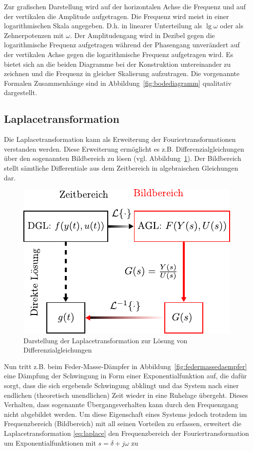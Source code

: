 %
Zur grafischen Darstellung wird auf der horizontalen Achse die Frequenz und auf der vertikalen die Amplitude aufgetragen. Die Frequenz wird meist in einer logarithmischen Skala angegeben. D.h. in linearer Unterteilung als $\lg\omega$ oder als Zehnerpotenzen mit $\omega$. 
%
Der Amplitudengang wird in Dezibel gegen die logarithmische Frequenz aufgetragen während der Phasengang unverändert auf der vertikalen Achse gegen die logarithmische Frequenz aufgetragen wird.
Es bietet sich an die beiden Diagramme bei der Konstruktion untereinander zu zeichnen und die Frequenz in gleicher Skalierung aufzutragen. Die vorgenannte Formalen Zusammenhänge sind in Abbildung~\ref{fig:bodediagramm} qualitativ dargestellt. 
%
\newpage
\subsection{Laplacetransformation}
%
Die Laplacetransformation kann als Erweiterung der Fouriertransformationen verstanden werden. Diese Erweiterung ermöglicht es z.B. Differenzialgleichungen über den sogenannten Bildbereich zu lösen (vgl. Abbildung~\ref{fig:laplacetransformation}). Der Bildbereich stellt sämtliche Differentiale aus dem Zeitbereich in algebraischen Gleichungen dar.
%
\begin{figure}[h]
	\centering
	\includegraphics[width=0.55\linewidth]{Abbildungen/Modellbildung/PDF/LaplaceTransformation.pdf}
	\caption{Darstellung der Laplacetransformation zur Lösung von Differenzialgleichungen}
	\label{fig:laplacetransformation}
\end{figure}
%
Nun tritt z.B. beim Feder-Masse-Dämpfer in Abbildung~\ref{fig:federmassedaempfer} eine Dämpfung der Schwingung in Form einer Exponentialfunktion auf, die dafür sorgt, dass die sich ergebende Schwingung abklingt und das System nach einer endlichen (theoretisch unendlichen) Zeit wieder in eine Ruhelage übergeht. Dieses Verhalten, dass sogenannte Übergangsverhalten kann durch den Frequenzgang nicht abgebildet werden. Um diese Eigenschaft eines Systems jedoch trotzdem im Frequenzbereich (Bildbereich) mit all seinen Vorteilen zu erfassen, erweitert die Laplacetransformation \eqref{eq:laplace} den Frequenzbereich der Fouriertransformation um Exponentialfunktionen mit $s=\delta+j\omega$ zu
